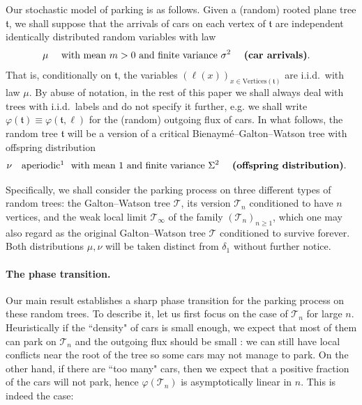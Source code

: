Our stochastic model of parking is as follows. Given a (random) rooted plane tree $ \mathfrak{t}$, we shall suppose that the arrivals of cars on each vertex of $ \mathfrak{t}$ are independent identically distributed random variables with law 
\begin{align*}  \mu \quad \mbox{ with mean }m >0  \mbox{ and finite variance } \sigma^{2} &&&\mbox{ \textbf{(car arrivals)}}.  \end{align*} That is, conditionally on $ \mathfrak{t}$, the variables $(\ell(x))_{x\in \mathrm{Vertices}( \mathfrak{t})}$ are i.i.d.~with law $\mu$. By abuse of notation, {in the rest of this paper we shall always deal with trees with i.i.d.~labels and do not specify it further, e.g. we shall write $\varphi( \mathfrak{t}) \equiv \varphi( \mathfrak{t}, \ell)$ for the (random) outgoing flux of cars}. In what follows, the random tree $ \mathfrak{t}$ will be a version of a critical Bienaym\'e--Galton--Watson tree with offspring distribution 
 \begin{align*} \nu \quad \mbox{aperiodic\footnotemark{ }   with mean }1 \mbox{ and finite variance } \Sigma^{2} &&&\mbox{ \textbf{(offspring distribution)}} . \end{align*}

%
%

Specifically, we shall consider the parking process on three different types of random trees: the Galton--Watson tree $ \mathcal{T}$, its version $\mathcal{T}_{n}$ conditioned to have $n$ vertices, and the weak local limit $\mathcal{T}_{\infty}$ of the family $(\mathcal{T}_{n})_{n\geq 1}$, which one may also regard as the original Galton--Watson tree $\mathcal T$ conditioned to survive forever. Both distributions $\mu, \nu$ will be taken distinct from  $\delta_{1}$ without further notice.
 
 \paragraph{The phase transition.} Our main result establishes a sharp phase transition for the parking process on these random trees. To describe it, let us first focus on the case of $ \mathcal{T}_{n}$ for large $n$. Heuristically if the ``density" of cars is small enough, we expect that most of them can park on $ \mathcal{T}_{n}$ and the outgoing flux should be small : we can still have local conflicts near the root of the tree so some cars may not manage to park. %
 On the other hand, if there are ``too many" cars, then we expect that a positive fraction of the cars will not park, hence $\varphi( \mathcal{T}_{n})$ is asymptotically linear in $n$.
This is indeed the case: 


